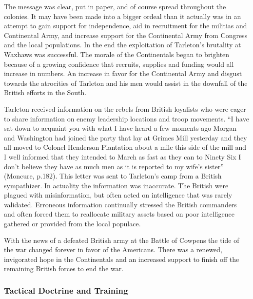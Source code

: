 The message was clear, put in paper, and of course spread throughout the
colonies.  It may have been made into a bigger ordeal than it actually was in an
attempt to gain support for independence, aid in recruitment for the militias
and Continental Army, and increase support for the Continental Army from
Congress and the local populations.  In the end the exploitation of Tarleton’s
brutality at Waxhaws was successful. The morale of the Continentals began to
brighten because of a growing confidence that recruits, supplies and funding
would all increase in numbers. An increase in favor for the Continental Army and
disgust towards the atrocities of Tarleton and his men would assist in the
downfall of the British efforts in the South.

Tarleton received information on the rebels from British loyalists who were
eager to share information on enemy leadership locations and troop movements. “I
have sat down to acquaint you with what I have heard a few moments ago Morgan
and Washington had joined the party that lay at Grimes Mill yesterday and they
all moved to Colonel Henderson Plantation about a mile this side of the mill and
I well informed that they intended to March as fast as they can to Ninety Six I
don’t believe they have as much men as it is reported to my wife’s sister”
(Moncure, p.182).  This letter was sent to Tarleton’s camp from a British
sympathizer.  In actuality the information was inaccurate.  The British were
plagued with misinformation, but often acted on intelligence that was rarely
validated.  Erroneous information continually stressed the British commanders
and often forced them to reallocate military assets based on poor intelligence
gathered or provided from the local populace.   

With the news of a defeated British army at the Battle of Cowpens the tide of
the war changed forever in favor of the Americans. There was a renewed,
invigorated hope in the Continentals and an increased support to finish off the
remaining British forces to end the war.
\subsubsection{Tactical Doctrine and Training}

